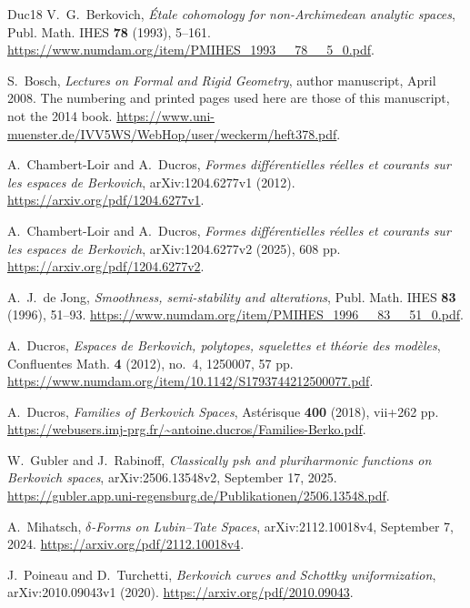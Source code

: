 \documentclass[11pt,a4paper]{article}
\numberwithin{equation}{section}
\theoremstyle{definition}
\theoremstyle{remark}
\begin{document}
\begin{thebibliography}{Duc18}
V.~G.~Berkovich,
\emph{\'Etale cohomology for non-Archimedean analytic spaces},
Publ. Math. IHES \textbf{78} (1993), 5--161.
\url{https://www.numdam.org/item/PMIHES_1993__78__5_0.pdf}.

S.~Bosch, \emph{Lectures on Formal and Rigid Geometry},
author manuscript, April 2008. The numbering and printed pages
used here are those of this manuscript, not the 2014 book.
\url{https://www.uni-muenster.de/IVV5WS/WebHop/user/weckerm/heft378.pdf}.

A.~Chambert-Loir and A.~Ducros,
\emph{Formes diff\'erentielles r\'eelles et courants sur les espaces
de Berkovich}, arXiv:1204.6277v1 (2012).
\url{https://arxiv.org/pdf/1204.6277v1}.

A.~Chambert-Loir and A.~Ducros,
\emph{Formes diff\'erentielles r\'eelles et courants sur les espaces
de Berkovich}, arXiv:1204.6277v2 (2025), 608 pp.
\url{https://arxiv.org/pdf/1204.6277v2}.

A.~J.~de Jong, \emph{Smoothness, semi-stability and alterations},
Publ. Math. IHES \textbf{83} (1996), 51--93.
\url{https://www.numdam.org/item/PMIHES_1996__83__51_0.pdf}.

A.~Ducros, \emph{Espaces de Berkovich, polytopes, squelettes
et th\'eorie des mod\`eles}, Confluentes Math.
\textbf{4} (2012), no.~4, 1250007, 57 pp.
\url{https://www.numdam.org/item/10.1142/S1793744212500077.pdf}.

A.~Ducros, \emph{Families of Berkovich Spaces},
Ast\'erisque \textbf{400} (2018), vii+262 pp.
\url{https://webusers.imj-prg.fr/~antoine.ducros/Families-Berko.pdf}.

W.~Gubler and J.~Rabinoff,
\emph{Classically psh and pluriharmonic functions on Berkovich spaces},
arXiv:2506.13548v2, September 17, 2025.
\url{https://gubler.app.uni-regensburg.de/Publikationen/2506.13548.pdf}.

A.~Mihatsch, \emph{$\delta$-Forms on Lubin--Tate Spaces},
arXiv:2112.10018v4, September 7, 2024.
\url{https://arxiv.org/pdf/2112.10018v4}.

J.~Poineau and D.~Turchetti,
\emph{Berkovich curves and Schottky uniformization},
arXiv:2010.09043v1 (2020).
\url{https://arxiv.org/pdf/2010.09043}.


\end{thebibliography}
\end{document}
